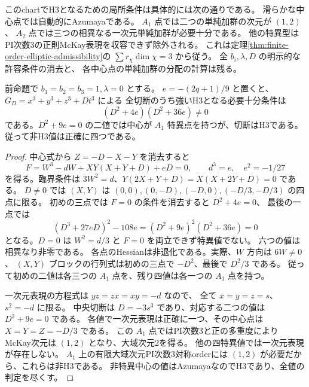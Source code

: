このchartでH3となるための局所条件は具体的には次の通りである。
滑らかな中心点では自動的にAzumayaである。
$A_1$ 点では二つの単純加群の次元が $(1,2)$、
$A_2$ 点では三つの相異なる一次元単純加群が必要十分である。
他の特異型はPI次数3の正則McKay表現を収容できず除外される。
これは定理\ref{thm:finite-order-elliptic-admissibility}の
$\sum r_\chi\dim\chi=3$ から従う。
全 $b_i,\lambda,D$ の明示的な許容条件の消去と、
各中心点の単純加群の分配の計算は残る。

\begin{theorem}[固定三捩れ包絡の全切断判定]
\label{thm:quantum3-fixed-all-cuts}
前命題で $b_1=b_2=b_3=1,\lambda=0$ とする。
$e=-(2q+1)/9$ と置くと、$G_D=x^3+y^3+z^3+Dt^3$ による
全切断のうち強いH3となる必要十分条件は
\[
 (D^2+4e)(D^2+36e)\ne0
\]
である。$D^2+9e=0$ の二値では中心が $A_1$ 特異点を持つが、切断はH3である。
従って非H3値は正確に四つである。
\end{theorem}
\begin{proof}
中心式から $Z=-D-X-Y$ を消去すると
\[
 F=W^3-dW+XY(X+Y+D)+eD=0,\qquad d^3=e,\quad e^2=-1/27
\]
を得る。臨界条件は
$3W^2=d$、$Y(2X+Y+D)=X(X+2Y+D)=0$ である。
$D\ne0$ では $(X,Y)$ は
$(0,0),(0,-D),(-D,0),(-D/3,-D/3)$ の四点に限る。
初めの三点では $F=0$ の条件を消去すると $D^2+4e=0$、
最後の一点では
\[
 (D^3+27eD)^2-108e=(D^2+9e)^2(D^2+36e)=0
\]
となる。$D=0$ は $W^2=d/3$ と $F=0$ を両立できず特異値でない。
六つの値は相異なり非零である。
各点のHessianは非退化である。実際、$W$ 方向は $6W\ne0$、
$(X,Y)$ ブロックの行列式は初めの三点で $-D^2$、最後で $D^2/3$ である。
従って初めの二値は各三つの $A_1$ 点を、残り四値は各一つの $A_1$ 点を持つ。

一次元表現の方程式は $yz=zx=xy=-d$ なので、
全て $x=y=z=s$、$s^2=-d$ に限る。
中央切断は $D=-3s^3$ であり、対応する二つの値は $D^2+9e=0$ である。
各値で一次元表現は正確に一つ、その中心点は
$X=Y=Z=-D/3$ である。
この $A_1$ 点ではPI次数3と正の多重度により
McKay次元は $(1,2)$ となり、大域次元2を得る。
他の四特異値では一次元表現が存在しない。
$A_1$ 上の有限大域次元PI次数3対称orderには $(1,2)$ が必要だから、これらは非H3である。
非特異中心の値はAzumayaなのでH3であり、全値の判定を尽くす。
\end{proof}

